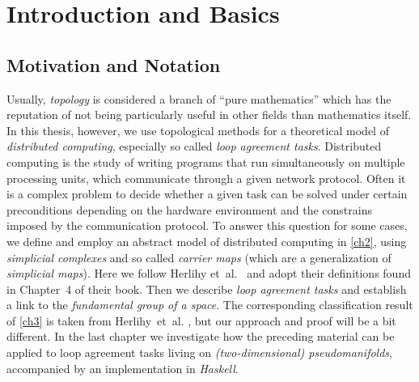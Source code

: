 \chapter{Introduction and Basics}
%
\section{Motivation and Notation}
Usually, \emph{topology} is considered a branch of \enquote{pure mathematics}
which has the reputation of not being particularly useful in other fields than
mathematics itself. In this thesis, however, we use topological methods for
a theoretical model of \emph{distributed computing}, especially so called
\emph{loop agreement tasks}. Distributed computing is the study of writing
programs that run simultaneously on multiple processing units, which
communicate through a given network protocol. Often it is a complex problem to
decide whether a given task can be solved under certain preconditions depending
on the hardware environment and the constrains imposed by the communication
protocol. To answer this question for some cases, we define and employ an
abstract model of distributed computing in \cref{ch2}, using \emph{simplicial
complexes} and so called \emph{carrier maps} (which are a generalization of
\emph{simplicial maps}). Here we follow 
Herlihy et~al.~\cite{bookc:herlihyetal13} and adopt their definitions found
in Chapter~4 of their book. Then we describe \emph{loop agreement
tasks} and establish a link to the \emph{fundamental group of a space}. The
corresponding classification result of \cref{ch3} is taken from Herlihy~et~al.
\cite[Ch.~15]{bookc:herlihyetal13}\cite{paper:herlihyrajsbaum03}, but our
approach and proof will be a bit different. In the last chapter we investigate
how the preceding material can be applied to loop agreement tasks living on
\emph{(two-dimensional) pseudomanifolds}, accompanied by an implementation in
\emph{Haskell}.

